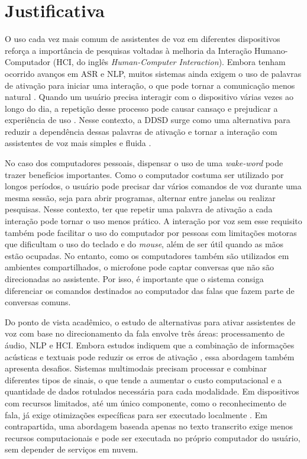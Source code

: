 \documentclass[
    12pt,                %
    openright,           %
    oneside,             %
    a4paper,             %
    english,             %
    brazil               %
]{abntex2}
\begin{document}
\section{Justificativa}
\label{sec:justificativa}

O uso cada vez mais comum de assistentes de voz em diferentes dispositivos reforça a importância de pesquisas voltadas à melhoria da Interação Humano-Computador (HCI, do inglês \textit{Human-Computer Interaction}). Embora tenham ocorrido avanços em ASR e NLP, muitos sistemas ainda exigem o uso de palavras de ativação para iniciar uma interação, o que pode tornar a comunicação menos natural \cite{Mallidi2018}. Quando um usuário precisa interagir com o dispositivo várias vezes ao longo do dia, a repetição desse processo pode causar cansaço e prejudicar a experiência de uso \cite{Nie2021}. Nesse contexto, a DDSD surge como uma alternativa para reduzir a dependência dessas palavras de ativação e tornar a interação com assistentes de voz mais simples e fluida \cite{Wagner2024}.

No caso dos computadores pessoais, dispensar o uso de uma \textit{wake-word} pode trazer benefícios importantes. Como o computador costuma ser utilizado por longos períodos, o usuário pode precisar dar vários comandos de voz durante uma mesma sessão, seja para abrir programas, alternar entre janelas ou realizar pesquisas. Nesse contexto, ter que repetir uma palavra de ativação a cada interação pode tornar o uso menos prático. A interação por voz sem esse requisito também pode facilitar o uso do computador por pessoas com limitações motoras que dificultam o uso do teclado e do \textit{mouse}, além de ser útil quando as mãos estão ocupadas. No entanto, como os computadores também são utilizados em ambientes compartilhados, o microfone pode captar conversas que não são direcionadas ao assistente. Por isso, é importante que o sistema consiga diferenciar os comandos destinados ao computador das falas que fazem parte de conversas comuns.

Do ponto de vista acadêmico, o estudo de alternativas para ativar assistentes de voz com base no direcionamento da fala envolve três áreas: processamento de áudio, NLP e HCI. Embora estudos indiquem que a combinação de informações acústicas e textuais pode reduzir os erros de ativação \cite{Wagner2024}, essa abordagem também apresenta desafios. Sistemas multimodais precisam processar e combinar diferentes tipos de sinais, o que tende a aumentar o custo computacional e a quantidade de dados rotulados necessária para cada modalidade. Em dispositivos com recursos limitados, até um único componente, como o reconhecimento de fala, já exige otimizações específicas para ser executado localmente \cite{Xu2024}. Em contrapartida, uma abordagem baseada apenas no texto transcrito exige menos recursos computacionais e pode ser executada no próprio computador do usuário, sem depender de serviços em nuvem.
\end{document}
